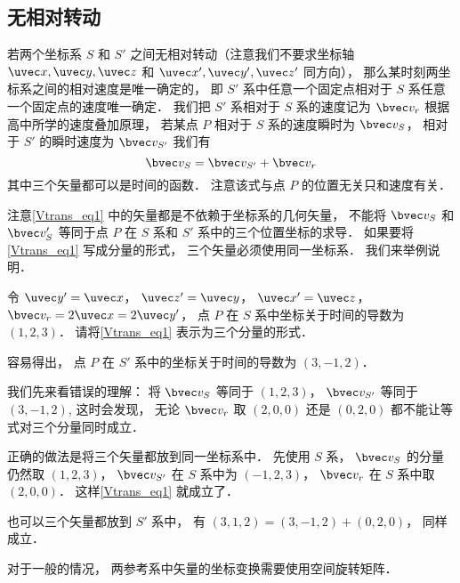 


\subsection{无相对转动}
若两个坐标系 $S$ 和 $S'$ 之间无相对转动（注意我们不要求坐标轴 $\uvec x, \uvec y, \uvec z$ 和 $\uvec x', \uvec y', \uvec z'$ 同方向）， 那么某时刻两坐标系之间的相对速度是唯一确定的， 即 $S'$ 系中任意一个固定点相对于 $S$ 系任意一个固定点的速度唯一确定． 我们把 $S'$ 系相对于 $S$ 系的速度记为 $\bvec v_r$ 根据高中所学的速度叠加原理， 若某点 $P$ 相对于 $S$ 系的速度瞬时为 $\bvec v_S$， 相对于 $S'$ 的瞬时速度为 $\bvec v_{S'}$ 我们有
\begin{equation}\label{Vtrans_eq1}
\bvec v_{S} = \bvec v_{S'} + \bvec v_r
\end{equation}
其中三个矢量都可以是时间的函数． 注意该式与点 $P$ 的位置无关只和速度有关．

注意\autoref{Vtrans_eq1} 中的矢量都是不依赖于坐标系的几何矢量， 不能将 $\bvec v_S$ 和 $\bvec v_S'$ 等同于点 $P$ 在 $S$ 系和 $S'$ 系中的三个位置坐标的求导． 如果要将\autoref{Vtrans_eq1} 写成分量的形式， 三个矢量必须使用同一坐标系． 我们来举例说明．

\begin{example}{}\label{Vtrans_ex2}
令 $\uvec y' = \uvec x$， $\uvec z' = \uvec y$， $\uvec x' = \uvec z$， $\bvec v_r = 2\uvec x = 2\uvec y'$， 点 $P$ 在 $S$ 系中坐标关于时间的导数为 $(1, 2, 3)$． 请将\autoref{Vtrans_eq1} 表示为三个分量的形式．

容易得出， 点 $P$ 在 $S'$ 系中的坐标关于时间的导数为 $(3, -1, 2)$．

我们先来看错误的理解： 将 $\bvec v_S$ 等同于 $(1, 2, 3)$， $\bvec v_{S'}$ 等同于 $(3, -1, 2)$,  这时会发现， 无论 $\bvec v_r$ 取 $(2, 0, 0)$ 还是 $(0, 2, 0)$ 都不能让等式对三个分量同时成立．

正确的做法是将三个矢量都放到同一坐标系中． 先使用 $S$ 系， $\bvec v_S$ 的分量仍然取 $(1, 2, 3)$， $\bvec v_{S'}$ 在 $S$ 系中为 $(-1, 2, 3)$， $\bvec v_r$ 在 $S$ 系中取 $(2, 0, 0)$． 这样\autoref{Vtrans_eq1} 就成立了．

也可以三个矢量都放到 $S'$ 系中， 有 $(3, 1, 2) = (3, -1, 2) + (0, 2, 0)$， 同样成立．
\end{example}

对于一般的情况， 两参考系中矢量的坐标变换需要使用空间旋转矩阵．

